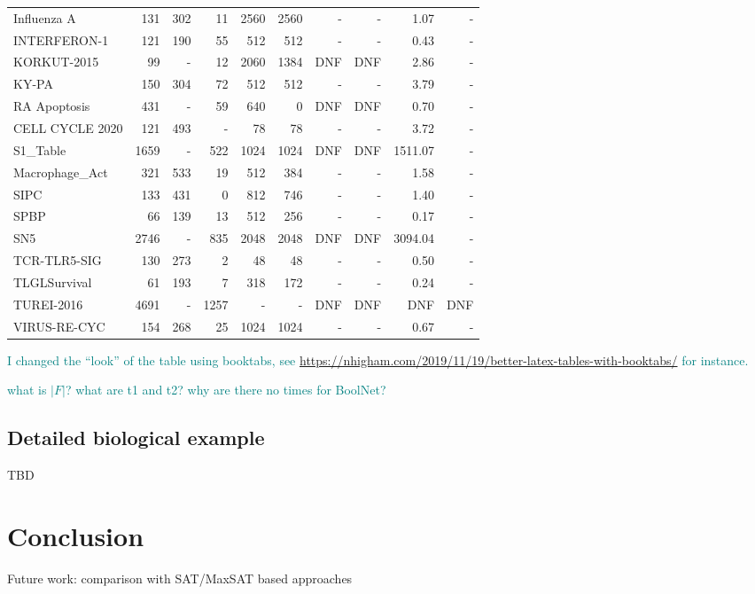 \documentclass[runningheads]{llncs}
\newcommand{\sylvain}[1]{\textcolor{teal}{#1}}
\begin{document}
\begin{table}[!ht]
\begin{tabular}{lrrrrrrrrr}
    Influenza A & 131 & 302 & 11 & 2560 & 2560 & - & - & 1.07 & - \\
    INTERFERON-1 & 121 & 190 & 55 & 512 & 512 & - & - & 0.43 & - \\
    KORKUT-2015 & 99 & - & 12 & 2060 & 1384 & DNF & DNF & 2.86 & - \\
    KY-PA & 150 & 304 & 72 & 512 & 512 & - & - & 3.79 & - \\
    RA Apoptosis & 431 & - & 59 & 640 & 0 & DNF & DNF & 0.70 & - \\
    CELL CYCLE 2020 & 121 & 493 & - & 78 & 78 & - & - & 3.72 & - \\
    S1\_Table & 1659 & - & 522 & 1024 & 1024 & DNF & DNF & 1511.07 & - \\
    Macrophage\_Act & 321 & 533 & 19 & 512 & 384 & - & - & 1.58 & - \\
    SIPC & 133 & 431 & 0 & 812 & 746 & - & - & 1.40 & - \\
    SPBP & 66 & 139 & 13 & 512 & 256 & - & - & 0.17 & - \\
    SN5 & 2746 & - & 835 & 2048 & 2048 & DNF & DNF & 3094.04 & - \\
    TCR-TLR5-SIG & 130 & 273 & 2 & 48 & 48 & - & - & 0.50 & - \\
    TLGLSurvival & 61 & 193 & 7 & 318 & 172 & - & - & 0.24 & - \\
    TUREI-2016 & 4691 & - & 1257 & - & - & DNF & DNF & DNF & DNF \\
    VIRUS-RE-CYC & 154 & 268 & 25 & 1024 & 1024 & - & - & 0.67 & - \\ \bottomrule
  \end{tabular}

\sylvain{I changed the ``look'' of the table using booktabs, see \url{https://nhigham.com/2019/11/19/better-latex-tables-with-booktabs/} for instance.}

\sylvain{what is $|F|$? what are t1 and t2? why are there no times for BoolNet?}
\end{table}

\subsection{Detailed biological example}

TBD

\section{Conclusion}

Future work: comparison with SAT/MaxSAT based approaches~\cite{nabli2016enumerating}
\end{document}
